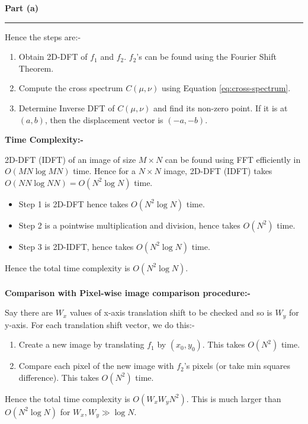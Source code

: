 \documentclass[a4paper,12pt]{article}
\newenvironment{solution}[2][]{%
\begin{mdframed}[linecolor=blue!70!black, linewidth=2pt, roundcorner=10pt, backgroundcolor=yellow!10!white, skipabove=12pt, skipbelow=12pt]%
	\textbf{\large #2}
	\par\noindent\rule{\textwidth}{0.4pt}
}{
\end{mdframed}
}
\begin{document}
\begin{solution}{Part (a)}
Hence the steps are:-
\begin{enumerate}
	\item Obtain 2D-DFT of $f_1$ and $f_2$. $f_2$'s can be found using the Fourier Shift Theorem.
	\item Compute the cross spectrum $C(\mu, \nu)$ using Equation \ref{eq:cross-spectrum}.
	\item Determine Inverse DFT of $C(\mu, \nu)$ and find its non-zero point. If it is at $(a, b)$, then the displacement vector is $(-a, -b)$.
\end{enumerate}

\textbf{\Large Time Complexity:-}

2D-DFT (IDFT) of an image of size $M \times N$ can be found using FFT efficiently in $O(MN \log MN)$ time. Hence for a $N \times N$ image, 2D-DFT (IDFT) takes $O(NN \log NN) = O(N^2 \log N)$ time.
\begin{itemize}
	\item Step 1 is 2D-DFT hence takes $O(N^2 \log N)$ time.
	\item Step 2 is a pointwise multiplication and division, hence takes $O(N^2)$ time.
	\item Step 3 is 2D-IDFT, hence takes $O(N^2 \log N)$ time.
\end{itemize}
Hence the total time complexity is $O(N^2 \log N)$. \\ \\
\textbf{\Large Comparison with Pixel-wise image comparison procedure:-}

Say there are $W_x$ values of x-axis translation shift to be checked and so is $W_y$ for y-axis. For each translation shift vector, we do this:-
\begin{enumerate}
	\item Create a new image by translating $f_1$ by $(x_0, y_0)$. This takes $O(N^2)$ time.
	\item Compare each pixel of the new image with $f_2$'s pixels (or take min squares difference). This takes $O(N^2)$ time.
\end{enumerate}
Hence the total time complexity is $O(W_x W_y N^2)$. This is much larger than $O(N^2 \log N)$ for $W_x, W_y \gg \log N$.
\end{solution}
\end{document}
